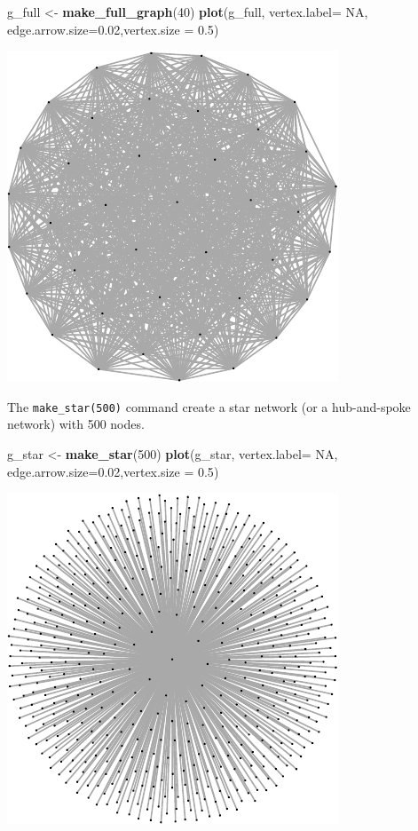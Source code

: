 \documentclass[]{article}
\newenvironment{Shaded}{\begin{snugshade}}{\end{snugshade}}
\newcommand{\KeywordTok}[1]{\textcolor[rgb]{0.13,0.29,0.53}{\textbf{#1}}}
\newcommand{\DataTypeTok}[1]{\textcolor[rgb]{0.13,0.29,0.53}{#1}}
\newcommand{\DecValTok}[1]{\textcolor[rgb]{0.00,0.00,0.81}{#1}}
\newcommand{\FloatTok}[1]{\textcolor[rgb]{0.00,0.00,0.81}{#1}}
\newcommand{\StringTok}[1]{\textcolor[rgb]{0.31,0.60,0.02}{#1}}
\newcommand{\OtherTok}[1]{\textcolor[rgb]{0.56,0.35,0.01}{#1}}
\newcommand{\NormalTok}[1]{#1}
\theoremstyle{definition}
\theoremstyle{definition}
\theoremstyle{definition}
\theoremstyle{remark}
\begin{document}
\begin{Shaded}
\begin{Highlighting}[]
\NormalTok{g_full <-}\StringTok{ }\KeywordTok{make_full_graph}\NormalTok{(}\DecValTok{40}\NormalTok{)}
\KeywordTok{plot}\NormalTok{(g_full, }\DataTypeTok{vertex.label=} \OtherTok{NA}\NormalTok{, }\DataTypeTok{edge.arrow.size=}\FloatTok{0.02}\NormalTok{,}\DataTypeTok{vertex.size =} \FloatTok{0.5}\NormalTok{)}
\end{Highlighting}
\end{Shaded}

\includegraphics{ResearchTools_files/figure-latex/unnamed-chunk-50-1.pdf}

The \texttt{make\_star(500)} command create a star network (or a
hub-and-spoke network) with 500 nodes.

\begin{Shaded}
\begin{Highlighting}[]
\NormalTok{g_star <-}\StringTok{ }\KeywordTok{make_star}\NormalTok{(}\DecValTok{500}\NormalTok{)}
\KeywordTok{plot}\NormalTok{(g_star, }\DataTypeTok{vertex.label=} \OtherTok{NA}\NormalTok{, }\DataTypeTok{edge.arrow.size=}\FloatTok{0.02}\NormalTok{,}\DataTypeTok{vertex.size =} \FloatTok{0.5}\NormalTok{)}
\end{Highlighting}
\end{Shaded}

\includegraphics{ResearchTools_files/figure-latex/unnamed-chunk-51-1.pdf}
\end{document}
